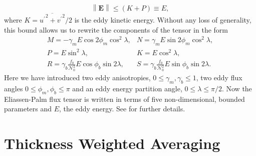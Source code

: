 \documentclass[12pt,a4paper]{report}
\newcommand*\mean[1]{\overline{#1}}
\newcommand*\res[1]{{#1}^{\prime}}
\begin{document}
                 \begin{equation}
                 {\left\|\boldsymbol{E}\right\|\leq \left(K+P\right)\equiv E},
                 \end{equation} 
                 where $K={\mean{{\res{u}}^{2} + {\res{v}}^{2}}}/{2}$ is the eddy
                 kinetic energy.
                 Without any loss of generality, this bound allows us to rewrite the components of the tensor in the form
                 \begin{equation}
                 \begin{array}{cc}
                 M = -\gamma_{m}E\cos{2\phi_{m}}\cos^{2}{\lambda}, & 
                 N = \gamma_{m}E\sin{2\phi_{m}}\cos^{2}{\lambda}, \\
                 P =  E\sin^{2}{\lambda}, &  K =  E\cos^{2}{\lambda},  \\
                 R =  \gamma_{b}\frac{f_{0}}{\mathcal{N}_{0}^{2}}E\cos{\phi_{b}}\sin{2\lambda}, &
                 S = \gamma_{b}\frac{f_{0}}{\mathcal{N}_{0}^{2}}E\sin{\phi_{b}}\sin{2\lambda} .
                 \end{array} 
                 \end{equation}
                 Here we have introduced two eddy anisotropies, $0\leq\gamma_{m},\gamma_{b}\leq1$, two eddy flux angles $0\leq\phi_{m},\phi_{b}\leq\pi$ and an eddy energy partition angle,
                 $0\leq\lambda\leq\pi/2$. Now the Eliassen-Palm flux tensor
                 is written in terms of five non-dimensional, bounded parameters
                 and $E$, the eddy energy. See \cite{marshall2012framework} for further details.
                 
                 
                 
                 \section{Thickness Weighted Averaging}
                 \label{youngtwa}
                 
\end{document}
